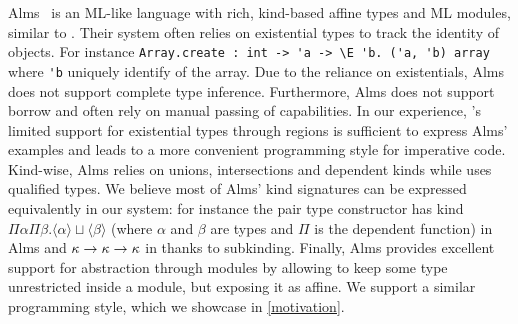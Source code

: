 Alms~\citep{DBLP:conf/popl/TovP11} is an ML-like language with rich, kind-based
affine types and ML modules, similar to \lang.
Their system often relies on existential types to track the identity
of objects. For instance
\lstinline/Array.create : int -> 'a -> \E 'b. ('a, 'b) array/ where
\lstinline/'b/ uniquely identify of the array.
Due to the reliance on existentials, Alms does not support complete type inference.
Furthermore, Alms does not support borrow and often rely
on manual passing of capabilities.
In our experience, \affe's limited support for existential types through
regions is sufficient to express Alms' examples and leads to
a more convenient programming style for imperative code.
%
Kind-wise, Alms relies
on unions, intersections and dependent kinds while
\lang uses qualified types.
We believe most of Alms' kind signatures can be expressed equivalently in
our system: for instance the pair type constructor
has kind $\Pi\alpha\Pi\beta. \langle\alpha\rangle \sqcup \langle\beta\rangle$
(where $\alpha$ and $\beta$ are types and $\Pi$ is the dependent function)
in Alms and $\kappa\to\kappa\to\kappa$ in \lang thanks
to subkinding.
%
Finally, Alms provides excellent support for abstraction through
modules by allowing to keep some type unrestricted inside a module, but
exposing it as affine. We support a similar programming style, which
we showcase in \cref{motivation}.

